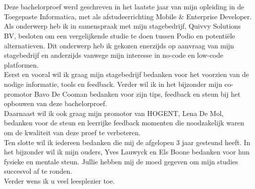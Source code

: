 
\chapter*{}%
\label{ch:voorwoord}


Deze bachelorproef werd geschreven in het laatste jaar van mijn opleiding in de Toegepaste Informatica, met als afstudeerrichting Mobile \& Enterprise Developer. \\

Als onderwerp heb ik in samenspraak met mijn stagebedrijf, Quivvy Solutions BV, besloten om een vergelijkende studie te doen tussen Podio en potentiële alternatieven. Dit onderwerp heb ik gekozen enerzijds op aanvraag van mijn stagebedrijf en anderzijds vanwege mijn interesse in no-code en low-code platformen. \\

Eerst en vooral wil ik graag mijn stagebedrijf bedanken voor het voorzien van de nodige informatie, tools en feedback. Verder wil ik in het bijzonder mijn co-promotor Bavo De Cooman bedanken voor zijn tips, feedback en steun bij het opbouwen van deze bachelorproef. \\

Daarnaast wil ik ook graag mijn promotor van HOGENT, Lena De Mol, bedanken voor de steun en leerrijke feedback momenten die noodzakelijk waren om de kwaliteit van deze proef te verbeteren. \\

Ten slotte wil ik iedereen bedanken die mij de afgelopen 3 jaar gesteund heeft. In het bijzonder wil ik mijn ouders, Yves Lauwyck en Els Boone bedanken voor hun fysieke en mentale steun. Jullie hebben mij de moed gegeven om mijn studies succesvol af te ronden. \\

Verder wens ik u veel leesplezier toe. \\